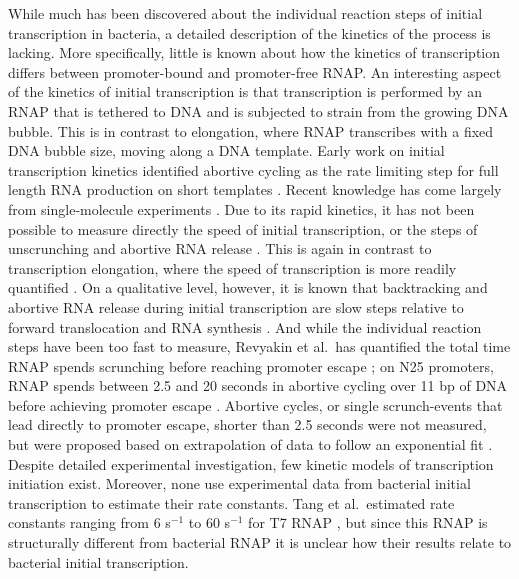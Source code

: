 While much has been discovered about the individual reaction steps of initial
transcription in bacteria, a detailed description of the kinetics of the
process is lacking. More specifically, little is known about how the kinetics
of transcription differs between promoter-bound and promoter-free RNAP. An
interesting aspect of the kinetics of initial transcription is that
transcription is performed by an RNAP that is tethered to
DNA and is subjected to strain from the growing DNA bubble.
This is in contrast to elongation, where RNAP transcribes with a fixed DNA
bubble size, moving along a DNA template. Early
work on initial transcription kinetics identified abortive cycling as the rate
limiting step for full length RNA production on short templates
\cite{stefano_lac_1979, munson_abortive_1981}. Recent knowledge has come
largely from single-molecule experiments \cite{revyakin_abortive_2006,
kapanidis_initial_2006, tang_real-time_2009, kapanidis_retention_2005,
margeat_direct_2006}. Due to its rapid kinetics, it has not been possible to
measure directly the speed of initial transcription, or the steps of
unscrunching and abortive RNA release \cite{revyakin_abortive_2006,
margeat_direct_2006}. This is again in contrast to transcription elongation,
where the speed of transcription is more readily quantified
\cite{wang_force_1998, tolic-norrelykke_diversity_2004,
bai_mechanochemical_2007}. On a qualitative level, however, it is known that
backtracking and abortive RNA release during initial transcription are slow
steps relative to forward translocation and RNA synthesis
\cite{revyakin_abortive_2006, margeat_direct_2006}. And while the individual
reaction steps have been too fast to measure, Revyakin et al.\ has quantified
the total time RNAP spends scrunching before reaching promoter escape
\cite{revyakin_abortive_2006}; on N25 promoters, RNAP spends between 2.5 and 20
seconds in abortive cycling over 11 bp of DNA before achieving promoter escape
\cite{revyakin_abortive_2006}. Abortive cycles, or single scrunch-events that
lead directly to promoter escape, shorter than 2.5 seconds were not measured,
but were proposed based on extrapolation of data to follow an exponential fit
\cite{revyakin_abortive_2006}. Despite detailed experimental investigation, few
kinetic models of transcription initiation exist. Moreover, none use
experimental data from bacterial initial transcription to estimate their rate
constants. Tang et al.\ estimated rate constants ranging from 6 s$^{-1}$ to 60
s$^{-1}$ for T7 RNAP \cite{tang_real-time_2009}, but since this RNAP is
structurally different from bacterial RNAP it is unclear how their results
relate to bacterial initial transcription.

